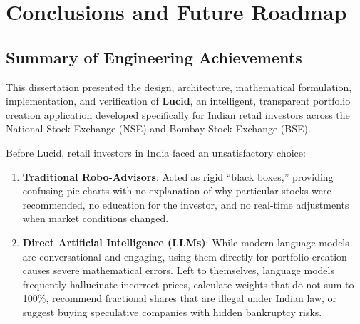 \chapter{Conclusions and Future Roadmap}

\section{Summary of Engineering Achievements}
This dissertation presented the design, architecture, mathematical formulation, implementation, and verification of \textbf{Lucid}, an intelligent, transparent portfolio creation application developed specifically for Indian retail investors across the National Stock Exchange (NSE) and Bombay Stock Exchange (BSE).

Before Lucid, retail investors in India faced an unsatisfactory choice:
\begin{enumerate}
    \item \textbf{Traditional Robo-Advisors}: Acted as rigid ``black boxes,'' providing confusing pie charts with no explanation of why particular stocks were recommended, no education for the investor, and no real-time adjustments when market conditions changed.
    \item \textbf{Direct Artificial Intelligence (LLMs)}: While modern language models are conversational and engaging, using them directly for portfolio creation causes severe mathematical errors. Left to themselves, language models frequently hallucinate incorrect prices, calculate weights that do not sum to 100\%, recommend fractional shares that are illegal under Indian law, or suggest buying speculative companies with hidden bankruptcy risks.
\end{enumerate}


